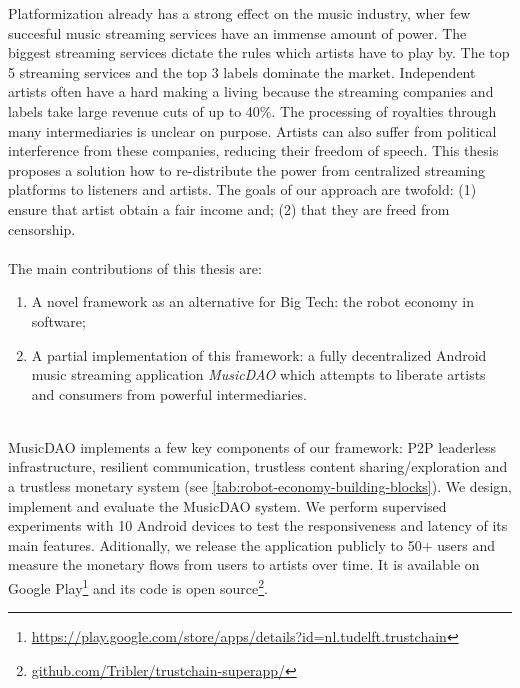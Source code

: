 Platformization already has a strong effect on the music industry, %
wher few succesful music streaming services have an immense amount of power. The biggest streaming services dictate the rules which artists have to play by. The top 5 streaming services and the top 3 labels dominate the market.
Independent artists often have a hard %
making a living because the streaming companies and labels take large revenue cuts of up to 40\%. The processing of royalties through many intermediaries is unclear on purpose. Artists can also suffer from political interference %
from these companies, reducing their freedom of speech. This thesis %
proposes a solution how to re-distribute the power from centralized streaming platforms to listeners and artists. The goals of our approach are twofold: %
(1) ensure that artist obtain a fair income and; (2) that they are freed from censorship. 
\\
\\
The main contributions of this thesis are:
\begin{enumerate}
    \item A novel framework as an alternative for Big Tech: the robot economy in software;
    \item A partial implementation of this framework: a fully decentralized Android music streaming application \textit{MusicDAO} which attempts to liberate artists and consumers from powerful intermediaries.
\end{enumerate}
\\
MusicDAO implements a few key components of our framework: P2P leaderless infrastructure, resilient communication, trustless content sharing/exploration and a trustless monetary system (see \ref{tab:robot-economy-building-blocks}). We design, implement and evaluate the MusicDAO system. We perform supervised experiments with 10 Android devices to test the responsiveness and latency of its main features. Aditionally, we release the application publicly to 50+ users and measure the monetary flows from users to artists over time. 
It is available on Google Play\footnote{\url{https://play.google.com/store/apps/details?id=nl.tudelft.trustchain}} and its code is open source\footnote{\url{github.com/Tribler/trustchain-superapp/}}.



